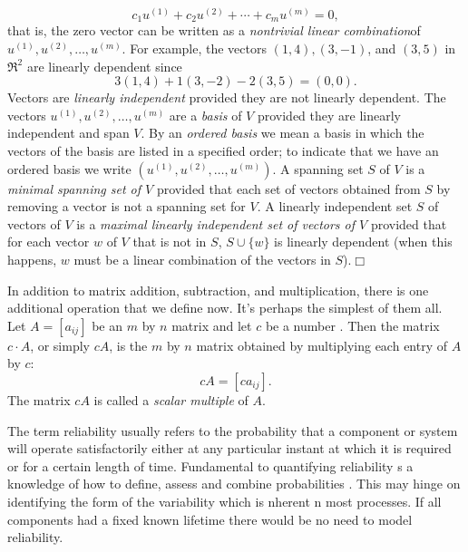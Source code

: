 \begin{definition}
{\[c_1u^{(1)}+c_2u^{(2)}+\cdots+c_mu^{(m)}=0,\]
that is, the zero vector can be written as a {\it nontrivial linear  
combination}\break of $u^{(1)},u^{(2)},\ldots,u^{(m)}$.
For example, the vectors $(1,4), (3,-1)$, and $(3,5)$ in $\Re^2$ are 
linearly 
dependent since
\[3(1,4)+1(3,-2)-2(3,5)=(0,0).\] Vectors are {\it linearly independent} provided  they are not linearly dependent.
The vectors 
$u^{(1)},u^{(2)},\ldots,u^{(m)}$ are a {\it basis}  of $V$ provided they are  
linearly independent and span $V$.
By an {\it ordered basis}  we mean a basis in which the vectors of the basis are listed 
in a specified order; to indicate that we have an ordered basis we write
$(u^{(1)},u^{(2)},\ldots,u^{(m)})$. 
A spanning set $S$ of $V$ is a  {\it minimal spanning set of $V$} provided that
each set 
of vectors obtained from $S$ by removing a vector is not a spanning set 
for $V$.
A linearly independent set $S$ of vectors of $V$ is a {\it maximal linearly 
independent set of vectors of $V$} provided that for each vector $w$ of 
$V$ that 
is not in $S$, $S\cup\{w\}$ is  linearly dependent (when this happens, 
$w$ must be  a linear combination of the vectors in 
$S$).\hfill{$\Box$}
}\end{definition}

In addition to matrix addition, subtraction, and multiplication, there is 
one additional operation that we define now. It's perhaps the simplest of 
them all. Let $A=[a_{ij}]$ be an $m$ by $n$ matrix and let $c$ be a 
number \cite{hyvarinen2001ica}. Then the matrix $c\cdot A$, or simply $cA$, is the $m$ by $n$ 
matrix obtained by multiplying each entry of $A$ by $c$:
\[c A=[ca_{ij}].\] 
The matrix $c A$ is called a {\it scalar multiple} of $A$.

The term reliability usually refers to the probability that a
component or system will operate satisfactorily either at any particular
instant at which it is required or for a certain length of
time. Fundamental to quantifying reliability s a knowledge of how to
define, assess and combine probabilities \cite{Bontempi2005Adaptive}. This may hinge on identifying the
form of the variability which is nherent n most processes. If all
components had a fixed known lifetime there would be no need to model
reliability.

